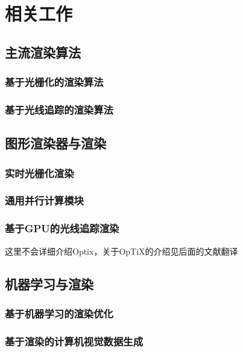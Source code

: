 \chapter{相关工作}
\label{cha:relatedwork}

\section{主流渲染算法}
\subsection{基于光栅化的渲染算法}
\subsection{基于光线追踪的渲染算法}

\section{图形渲染器与渲染}
\subsection{实时光栅化渲染}
\subsection{通用并行计算模块}
\subsection{基于GPU的光线追踪渲染}
这里不会详细介绍Optix，关于OpTiX的介绍见后面的文献翻译

\section{机器学习与渲染}
\subsection{基于机器学习的渲染优化}
\subsection{基于渲染的计算机视觉数据生成}
